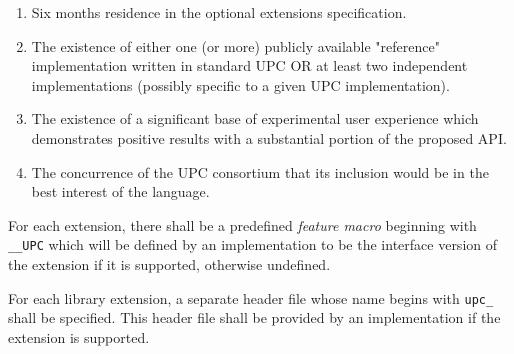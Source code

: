 \begin{enumerate}
\item Six months residence in the optional extensions specification.

\item The existence of either one (or more) publicly available "reference" implementation 
written in standard UPC OR at least two independent implementations (possibly specific 
to a given UPC implementation).

\item The existence of a significant base of experimental user experience
   which demonstrates positive results with a substantial portion of the
   proposed API.

\item The concurrence of the UPC consortium that its inclusion would be
    in the best interest of the language.
\end{enumerate}

\np For each extension, there shall be a predefined {\em feature macro}
   beginning with {\tt \_\_UPC} which will be defined by an implementation
   to be the interface version of the extension if it is supported, otherwise
   undefined.

\np For each library extension, a separate header file whose name begins with
    {\tt upc\_} shall be specified.  This header file shall be provided by an
    implementation if the extension is supported.
